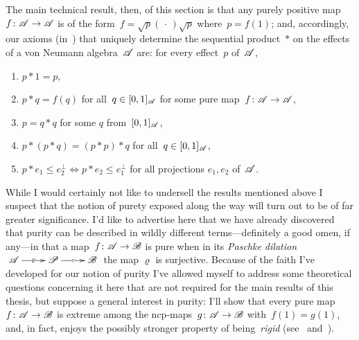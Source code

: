 \documentclass[a]{subfiles}
\begin{document}
\begin{parsec}
\begin{point}
The main technical result, then, of this section
is that any purely positive map $f\colon\mathscr{A}\to\mathscr{A}$
is of the form~$f=\sqrt{p}(\,\cdot\,)\sqrt{p}$
where~$p=f(1)$;
and, accordingly, our axioms 
(in~)
that uniquely
determine the sequential product~$\ast$
on the effects of a von Neumann algebra~$\mathscr{A}$ are:
for every effect~$p$ of~$\mathscr{A}$,
\begin{enumerate}
\item
$p\ast 1=p$,
\item
$p\ast q = f(q)$
for all~$q\in [0,1]_{\mathscr{A}}$
for some pure map~$f\colon \mathscr{A}\to\mathscr{A}$,
\item
$p=q\ast q$ for some $q$ from~$[0,1]_{\mathscr{A}}$,
\item
$p \ast (p \ast q) = (p\ast p)\ast q$
for all~$q\in[0,1]_{\mathscr{A}}$,
\item
$p \ast e_1 \leq e_2^\perp\iff
p \ast e_2 \leq e_1^\perp$
for all projections $e_1,e_2$ of~$\mathscr{A}$.
\end{enumerate}%
While I would certainly not like
to undersell the results mentioned above
I suspect that the notion of purety exposed along the way
will turn out to be of far greater significance.
I'd like to advertise
here that we have already discovered that purity can be described in
wildly different terms---definitely a good omen, if any---in
that a map~$f\colon \mathscr{A}\to\mathscr{B}$ is pure when in its 
\emph{Paschke dilation} 
$\xymatrix{\scrA
	\ar[r]|-\varrho
&
	\scrP\ar[r]|-c
&
\scrB}$
the map $\varrho$ is surjective.
Because of the faith I've developed for our notion of purity I've allowed myself
to address some theoretical questions concerning it
here that are not required for the main results of this thesis,
but suppose a general interest in purity:
I'll show that every pure map~$f\colon\mathscr{A}\to\mathscr{B}$
is extreme among the ncp-maps~$g\colon \mathscr{A}\to\mathscr{B}$ with~$f(1)=g(1)$,
and, in fact, enjoys the possibly stronger property 
of being~\emph{rigid} (see~ and~).
\end{point}
\end{parsec}
\end{document}
